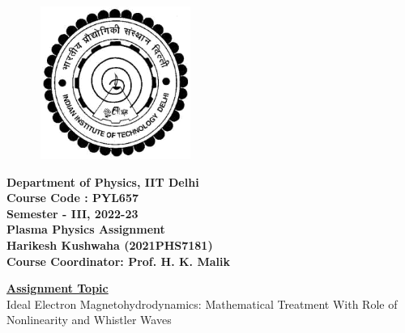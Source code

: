 \documentclass[12pt]{article}
\newenvironment{changemargin}[2]{%
\begin{list}{}{%
\setlength{\topsep}{0pt}%
\setlength{\leftmargin}{#1}%
\setlength{\rightmargin}{#2}%
\setlength{\listparindent}{\parindent}%
\setlength{\itemindent}{\parindent}%
\setlength{\parsep}{\parskip}%
}%
\item[]}{\end{list}}
\begin{document}
\begin{titlepage}
    \begin{changemargin}{-2cm}{-2cm}
        \begin{figure}
            \includegraphics[width=5cm, height=5cm]{logo.png}
            \centering
        \end{figure}
        \begin{center}
            \textbf{\Large{Department of Physics, IIT Delhi}}\\
            \vspace*{1cm}
            \textbf{\Large{Course Code : PYL657}}\\
            \vspace*{0.2cm}
            \textbf{\Large {Semester - III, 2022-23}}\\
            \vspace*{1cm}
            \textbf{\LARGE{Plasma Physics Assignment}}\\
            \vspace*{1cm}
            \textbf{\Large {Harikesh Kushwaha (2021PHS7181)}}\\
            \vspace*{1cm}
            \textbf{\Large {Course Coordinator: Prof. H. K. Malik}}\\
            \vspace*{1cm}
        \end{center}
        \begin{flushleft}
            \underline{\textbf{\LARGE{Assignment Topic}}}\\
            \Large{Ideal Electron Magnetohydrodynamics: Mathematical Treatment With Role of Nonlinearity and Whistler Waves}
        \end{flushleft}
    \end{changemargin}
\end{titlepage}
\end{document}

